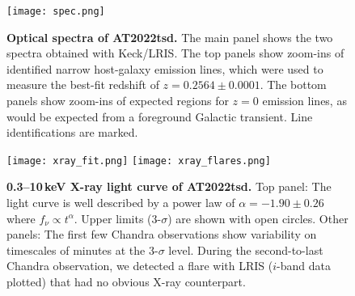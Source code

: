 \documentclass{nature_plusfigure}
\newcommand{\apj}{{Astrophys. J.}}
\newcommand{\aap}{{Astron. Astrophys.}}
\newcommand{\at}{AT2022tsd}
\begin{document}
\begin{methods}
\begin{thebibliography}{10}
%
%
%

\end{thebibliography}

\end{methods}

\clearpage

\begin{extended_data}

\renewcommand{\thefigure}{\arabic{figure}~Extended~Data}
\renewcommand{\thefigure}{Extended Data Figure \arabic{figure}}
\renewcommand{\figurename}{}
\setcounter{figure}{0}

\renewcommand{\thetable}{\arabic{table}~Extended~Data}
\renewcommand{\thetable}{Extended Data Table \arabic{table}}
\renewcommand{\tablename}{}
\setcounter{table}{0}

\begin{figure}[ht]
 \centering
\texttt{[image: spec.png]}
  \caption{\textbf{Optical spectra of \at.} The main panel shows the two spectra obtained with Keck/LRIS. The top panels show zoom-ins of identified narrow host-galaxy emission lines, which were used to measure the best-fit redshift of $z=0.2564\pm0.0001$. The bottom panels show zoom-ins of expected regions for $z=0$ emission lines, as would be expected from a foreground Galactic transient. Line identifications are marked.}
 \label{fig:spec}
\end{figure}

\begin{figure}[!ht]
 \centering
\texttt{[image: xray\_fit.png]}
\texttt{[image: xray\_flares.png]}
  \caption{\textbf{0.3--10\,keV X-ray light curve of \at.} Top panel: The light curve is well described by a power law of $\alpha=-1.90\pm0.26$ where $f_\nu \propto t^{\alpha}$. Upper limits (3-$\sigma$) are shown with open circles. Other panels: The first few Chandra observations show variability on timescales of minutes at the 3-$\sigma$ level. During the second-to-last Chandra observation, we detected a flare with LRIS ($i$-band data plotted) that had no obvious X-ray counterpart.}
 \label{fig:xray-lc}
\end{figure}


\end{extended_data}
\end{document}
